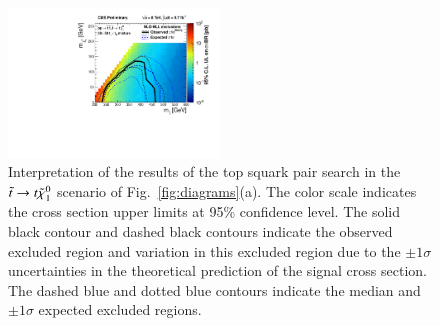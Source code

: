 \begin{figure}
\centering
\includegraphics[width=0.5\textwidth]{HCPPlots/stop_interpretation.pdf}
\caption{Interpretation of the results of the top squark pair search in the $\tilde{t}\to t\tilde{\chi}_{1}^{0}$ scenario of 
Fig.~\ref{fig:diagrams}(a). The color scale indicates the cross section upper limits at 95\% confidence level. The solid black contour 
and dashed black contours indicate the observed excluded region and variation in this
excluded region due to the $\pm1\sigma$ uncertainties in the theoretical prediction of the signal cross section. The dashed blue
and dotted blue contours indicate the median and $\pm1\sigma$ expected excluded regions. }
\label{fig:stop_interpretation}       %
\end{figure}
